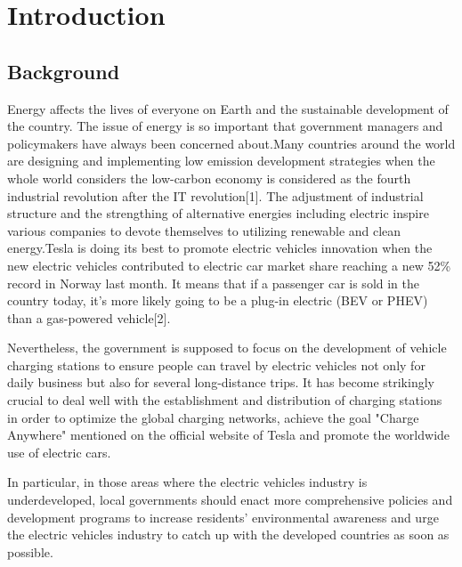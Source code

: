 \documentclass{mcmthesis}
\begin{document}
\maketitle                  %

\tableofcontents
\newpage

\section{Introduction}
	\subsection{Background}
	 Energy affects the lives of everyone on Earth and the sustainable development of the country. The issue of energy is so important that government managers and policymakers have always been concerned about.Many countries around the world are designing and implementing low emission development strategies when the whole world considers the low-carbon economy is considered as the fourth industrial revolution after the IT revolution[1]. The adjustment of industrial structure and the strengthing of alternative energies including electric inspire various companies to devote themselves to utilizing renewable and clean energy.Tesla is doing its best to promote electric vehicles innovation when the new electric vehicles contributed to electric car market share reaching a new 52\% record in Norway last month. It means that if a passenger car is sold in the country today, it’s more likely going to be a plug-in electric (BEV or PHEV) than a gas-powered vehicle[2].
	\par
	Nevertheless, the government is supposed to focus on the development of vehicle charging stations to ensure people can travel by electric vehicles not only for daily business but also for several long-distance trips. It has become strikingly crucial to deal well with the establishment and distribution of charging stations in order to optimize the global charging networks, achieve the goal "Charge Anywhere" mentioned on the official website of Tesla and promote the worldwide use of electric cars.
	\par
	In particular,  in those areas where the electric vehicles industry is underdeveloped, local governments should enact more comprehensive policies and development programs to increase residents' environmental awareness and urge the electric vehicles industry to catch up with the developed countries as soon as possible.
\end{document}

